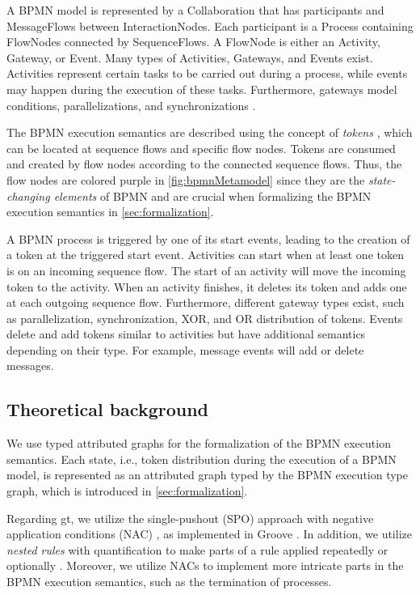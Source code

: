 \documentclass[runningheads]{llncs}
\begin{document}
A BPMN model is represented by a \textsf{Collaboration} that has \textsf{participants} and \textsf{MessageFlows} between \textsf{InteractionNodes}.
Each participant is a \textsf{Process} containing \textsf{FlowNodes} connected by \textsf{SequenceFlows}.
A \textsf{FlowNode} is either an \textsf{Activity}, \textsf{Gateway}, or \textsf{Event}.
Many types of \textsf{Activities}, \textsf{Gateways}, and \textsf{Events} exist.
Activities represent certain tasks to be carried out during a process, while events may happen during the execution of these tasks.
Furthermore, gateways model conditions, parallelizations, and synchronizations \cite{freundRealLifeBPMNUsing2019}.

The BPMN execution semantics are described using the concept of \emph{tokens} \cite{objectmanagementgroupBusinessProcessModel2013}, which can be located at sequence flows and specific flow nodes.
Tokens are consumed and created by flow nodes according to the connected sequence flows.
Thus, the flow nodes are colored purple in \autoref{fig:bpmnMetamodel} since they are the \textit{state-changing elements} of BPMN and are crucial when formalizing the BPMN execution semantics in \autoref{sec:formalization}.

A BPMN process is triggered by one of its start events, leading to the creation of a token at the triggered start event.
Activities can start when at least one token is on an incoming sequence flow.
The start of an activity will move the incoming token to the activity.
When an activity finishes, it deletes its token and adds one at each outgoing sequence flow.
Furthermore, different gateway types exist, such as parallelization, synchronization, XOR, and OR distribution of tokens.
Events delete and add tokens similar to activities but have additional semantics depending on their type.
For example, message events will add or delete messages.

\subsection{Theoretical background}
We use typed attributed graphs for the formalization of the BPMN execution semantics.
Each state, i.e., token distribution during the execution of a BPMN model, is represented as an attributed graph typed by the BPMN execution type graph, which is introduced in \autoref{sec:formalization}.

Regarding \gls*{gt}, we utilize the single-pushout (SPO) approach with negative application conditions (NAC) \cite{ehrigALGEBRAICAPPROACHESGRAPH1997}, as implemented in Groove \cite{rensinkGROOVESimulatorTool2004}.
In addition, we utilize \emph{nested rules} with quantification to make parts of a rule applied repeatedly or optionally \cite{rensinkNestedQuantificationGraph2006,rensinkHowMuchAre2017}.
Moreover, we utilize NACs to implement more intricate parts in the BPMN execution semantics, such as the termination of processes.
\end{document}
